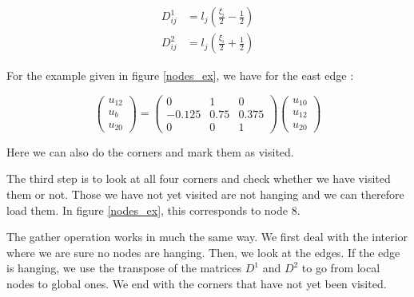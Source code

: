 \begin{align*}
D^1_{ij} &= l_j\left(\frac{\xi_i}{2}-\frac{1}{2}\right)\\
D^2_{ij} &= l_j\left(\frac{\xi_i}{2}+\frac{1}{2}\right)
\end{align*}

For the example given in figure \ref{nodes_ex}, we have for the east edge :

$$ \begin{pmatrix}
u_{12} \\ u_b \\ u_{20}
\end{pmatrix} = \begin{pmatrix}
0 & 1 & 0\\
-0.125 & 0.75 & 0.375\\
0 & 0 & 1
\end{pmatrix}\begin{pmatrix}
u_{10} \\ u_{12} \\ u_{20}
\end{pmatrix}$$

Here we can also do the corners and mark them as visited.

The third step is to look at all four corners and check whether we have visited them or not. Those we have not yet visited are not hanging and we can therefore load them. In figure \ref{nodes_ex}, this corresponds to node 8. 

The gather operation works in much the same way. We first deal with the interior where we are sure no nodes are hanging. Then, we look at the edges. If the edge is hanging, we use the transpose of the matrices $D^1$ and $D^2$ to go from local nodes to global ones. We end with the corners that have not yet been visited. 


